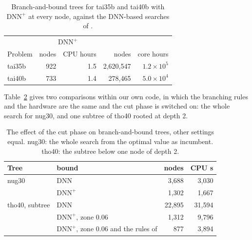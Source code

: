 \documentclass[11pt]{article}
\theoremstyle{remark}
\newcommand{\DNNp}{\mathrm{DNN}^{+}}
\begin{document}
\begin{table}[t]\centering
\caption{Branch-and-bound trees for tai35b and tai40b with $\DNNp$ at every
node, against the DNN-based searches of \cite[Table~4]{fujii}.}\label{tab:trees}
\small
\begin{tabular}{lrrrr}
\toprule
 & \multicolumn{2}{c}{$\DNNp$} & \multicolumn{2}{c}{\cite{fujii}}\\
Problem & nodes & CPU hours & nodes & core hours\\
\midrule
tai35b & 922 & 1.5 & 2,620,547 & $1.2\times10^5$\\
tai40b & 733 & 1.4 & 278,465 & $5.0\times10^4$\\
\bottomrule
\end{tabular}
\end{table}

Table~\ref{tab:ab} gives two comparisons within our own code, in which the
branching rules and the hardware are the same and the cut phase is switched on:
the whole search for nug30, and one subtree of tho40 rooted at depth 2.

\begin{table}[t]\centering
\caption{The effect of the cut phase on branch-and-bound trees, other settings
equal. nug30: the whole search from the optimal value as incumbent. tho40: the
subtree below one node of depth 2.}\label{tab:ab}
\small
\begin{tabular}{llrr}
\toprule
Tree & bound & nodes & CPU s\\
\midrule
nug30 & DNN & 3,688 & 3,030\\
 & $\DNNp$ & 1,302 & 1,667\\
\midrule
tho40, subtree & DNN & 22,895 & 31,594\\
 & $\DNNp$, zone 0.06 & 1,312 & 9,796\\
 & $\DNNp$, zone 0.06 and the rules of \cite{companion} & 877 & 3,894\\
\bottomrule
\end{tabular}
\end{table}
\end{document}
